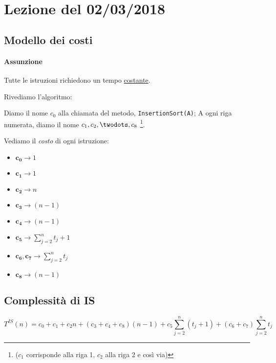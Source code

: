 \section{Lezione del 02/03/2018}

\subsection{Modello dei costi}
\paragraph{Assunzione} Tutte le istruzioni richiedono un tempo \underline{costante}.

Rivediamo l'algoritmo:



Diamo il nome $c_0$ alla chiamata del metodo, \texttt{InsertionSort(A)};
A ogni riga numerata, diamo il nome $c_1, c_2,\twodots ,c_8$
\footnote{($c_1$ corrisponde alla riga 1, $c_2$ alla riga 2 e così via)}.\par
Vediamo il \emph{costo} di ogni istruzione:

\begin{itemize}
    \item[] $\boldsymbol{c_0} \rightarrow 1$
    \item[] $\boldsymbol{c_1} \rightarrow 1$
    \item[] $\boldsymbol{c_2} \rightarrow n$
    \item[] $\boldsymbol{c_3} \rightarrow (n-1)$
    \item[] $\boldsymbol{c_4} \rightarrow (n-1)$
    \item[] $\boldsymbol{c_5} \rightarrow \displaystyle\sum_{j=2}^{n} t_j+1$
    \item[] $\boldsymbol{c_6}, \boldsymbol{c_7} \rightarrow \displaystyle\sum_{j=2}^{n} t_j$
    \item[] $\boldsymbol{c_8} \rightarrow (n-1)$
\end{itemize}

\subsection{Complessità di IS} \label{is:complessita}
\begin{displaymath}
    T^{IS}(n) = c_0 + c_1 + c_2n + (c_3+c_4+c_8)(n-1)
    + c_5\displaystyle\sum_{j=2}^{n}(t_j+1) + (c_6+c_7)\displaystyle\sum_{j=2}^{n}t_j
\end{displaymath}

